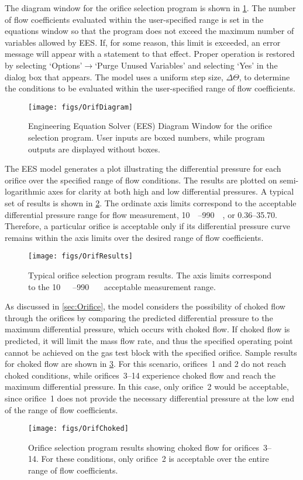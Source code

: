 The diagram window for the orifice selection program is shown in \cref{fig:OrifDiag}.
The number of flow coefficients evaluated within the 
user-specified range is set in the equations window so
that the program does not exceed the maximum number of variables allowed by EES.
If, for some reason, this limit is exceeded, an error message will appear with
a statement to that effect.
Proper operation is restored
by selecting `Options'$\to$`Purge Unused Variables' and selecting `Yes' in the dialog box that appears.
The model uses a uniform step size, $\Delta\Theta$, to determine the conditions 
to be evaluated within the user-specified range of flow coefficients.
\begin{figure}[tbp]
  \centering
  \texttt{[image: figs/OrifDiagram]}
  \caption{Engineering Equation Solver (EES) Diagram Window for the orifice
    selection program. User inputs are boxed numbers, while program outputs 
    are displayed without boxes.}
  \label{fig:OrifDiag}
\end{figure}

The EES model generates a plot illustrating
the differential pressure for each orifice over the specified range of flow conditions.
The results are plotted on semi-logarithmic axes for clarity at both high and low
differential pressures.
A typical set of results is shown in \cref{fig:OrifResults}.
The ordinate axis limits correspond to the acceptable differential pressure range
for flow measurement, \SIrange{10}{990}{\inch{}}, or \SIrange{0.36}{35.70}{\psid}.
Therefore, a particular orifice is acceptable only if its differential pressure curve remains 
within the axis limits over the desired range of flow coefficients.
\begin{figure}[tbp]
  \centering
  \texttt{[image: figs/OrifResults]}
  \caption{Typical orifice selection program results. The axis limits correspond
    to the \SIrange{10}{990}{\inch\protect{}} acceptable measurement range.}
  \label{fig:OrifResults}
\end{figure}

As discussed in \cref{sec:Orifice}, the model considers the possibility of 
choked flow through the orifices by comparing the predicted differential pressure
to the maximum differential pressure, which occurs with choked flow.
If choked flow is predicted, it will limit the mass flow rate, and thus
the specified operating point cannot be achieved on the gas test block with the 
specified orifice.
Sample results for choked flow are shown in \cref{fig:OrifChoked}.
For this scenario, orifices~1 and 2 do not reach choked conditions, while
orifices~3--14 experience choked flow and reach the maximum differential pressure.
In this case, only orifice~2 would be acceptable, since orifice~1 does not provide
the necessary differential pressure at the low end of the range of flow coefficients.
\begin{figure}[tbp]
  \centering
  \texttt{[image: figs/OrifChoked]}
  \caption{Orifice selection program results showing choked flow for orifices~3--14. 
    For these conditions, only orifice~2 is acceptable over the entire range of flow coefficients.}
  \label{fig:OrifChoked}
\end{figure}

